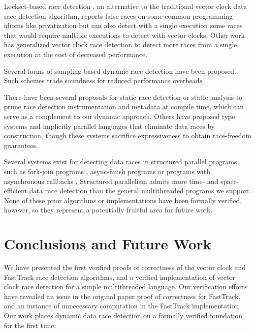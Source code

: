 \documentclass[preprint, 10pt]{sigplanconf}
\begin{document}
Lockset-based race detection \cite{dinning_detecting_1991,savage_eraser:_1997}, an alternative to the traditional vector clock data race detection algorithm, reports false races on some common programming idioms like privatization but can also detect with a single execution some races that would require multiple executions to detect with vector clocks. Other work has generalized vector clock race detection to detect more races from a single execution \cite{smaragdakis_sound_2012,sen_detecting_2005,chen_parametric_2007} at the cost of decreased performance.

Several forms of sampling-based dynamic race detection have been proposed. Such schemes trade soundness \cite{greathouse_demand-driven_2011,bond_pacer:_2010,marino_literace:_2009,erickson_effective_2010,effinger-dean_ifrit:_2012} for reduced performance overheads.

There have been several proposals for static race detection \cite{engler_racerx:_2003,naik_effective_2006} or static analysis \cite{flanagan_redcard:_2013,joserenau} to prune race detection instrumentation and metadata at compile time, which can serve as a complement to our dynamic approach. Others have proposed type systems \cite{abadi_types_2006,bocchino_type_2009,rust} and implicitly parallel languages \cite{rinard_design_1998,guy_blelloch_nesl:_1992} that eliminate data races by construction, though these systems sacrifice expressiveness to obtain race-freedom guarantees.

Several systems exist for detecting data races in structured parallel programs such as fork-join programs \cite{john_mellor-crummey_--fly_1991,feng_efficient_1997,mai_zheng_grace:_2011,michael_boyer_automated_2008}, async-finish programs \cite{raman_scalable_2012} or programs with asynchronous callbacks \cite{petrov_race_2012,raychev_effective_2013,hsiao_race_2014,vechev_oopsla_2015}. Structured parallelism admits more time- and space-efficient data race detection than the general multithreaded programs we support. None of these prior algorithms or implementations have been formally verified, however, so they represent a potentially fruitful area for future work.

\section{Conclusions and Future Work}
\label{conclusion}

We have presented the first verified proofs of correctness of the vector clock and FastTrack race detection algorithms, and a verified implementation of vector clock race detection for a simple multithreaded language. Our verification efforts have revealed an issue in the original paper proof of correctness for FastTrack, and an instance of unnecessary computation in the FastTrack implementation. Our work places dynamic data race detection on a formally verified foundation for the first time.
\end{document}
